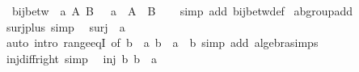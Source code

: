 \begin{isabellebody}
\ \ {\isachardoublequoteopen}bij{\isacharunderscore}{\kern0pt}betw\ {\isacharparenleft}{\kern0pt}{\isacharparenleft}{\kern0pt}{\isacharplus}{\kern0pt}{\isacharparenright}{\kern0pt}\ a{\isacharparenright}{\kern0pt}\ A\ B\ {\isasymlongleftrightarrow}\ {\isacharparenleft}{\kern0pt}{\isacharplus}{\kern0pt}{\isacharparenright}{\kern0pt}\ a\ {\isacharbackquote}{\kern0pt}\ A\ {\isacharequal}{\kern0pt}\ B{\isachardoublequoteclose}\isanewline
%
\isadelimproof
\ \ %
\endisadelimproof
%
\isatagproof
{}\isamarkupfalse%
\ {\isacharparenleft}{\kern0pt}simp\ add{\isacharcolon}{\kern0pt}\ bij{\isacharunderscore}{\kern0pt}betw{\isacharunderscore}{\kern0pt}def{\isacharparenright}{\kern0pt}%
\endisatagproof
{\isafoldproof}%
%
\isadelimproof
\isanewline
%
\endisadelimproof
\isanewline
{}\isamarkupfalse%
\isanewline
\isanewline
{}\isamarkupfalse%
\ ab{\isacharunderscore}{\kern0pt}group{\isacharunderscore}{\kern0pt}add\isanewline
{}\isanewline
\isanewline
{}\isamarkupfalse%
\ surj{\isacharunderscore}{\kern0pt}plus\ {\isacharbrackleft}{\kern0pt}simp{\isacharbrackright}{\kern0pt}{\isacharcolon}{\kern0pt}\isanewline
\ \ {\isachardoublequoteopen}surj\ {\isacharparenleft}{\kern0pt}{\isacharparenleft}{\kern0pt}{\isacharplus}{\kern0pt}{\isacharparenright}{\kern0pt}\ a{\isacharparenright}{\kern0pt}{\isachardoublequoteclose}\isanewline
%
\isadelimproof
\ \ %
\endisadelimproof
%
\isatagproof
{}\isamarkupfalse%
\ {\isacharparenleft}{\kern0pt}auto\ intro{\isacharbang}{\kern0pt}{\isacharcolon}{\kern0pt}\ range{\isacharunderscore}{\kern0pt}eqI\ {\isacharbrackleft}{\kern0pt}of\ b\ {\isachardoublequoteopen}{\isacharparenleft}{\kern0pt}{\isacharplus}{\kern0pt}{\isacharparenright}{\kern0pt}\ a{\isachardoublequoteclose}\ {\isachardoublequoteopen}b\ {\isacharminus}{\kern0pt}\ a{\isachardoublequoteclose}\ \ b{\isacharbrackright}{\kern0pt}{\isacharparenright}{\kern0pt}\ {\isacharparenleft}{\kern0pt}simp\ add{\isacharcolon}{\kern0pt}\ algebra{\isacharunderscore}{\kern0pt}simps{\isacharparenright}{\kern0pt}%
\endisatagproof
{\isafoldproof}%
%
\isadelimproof
\isanewline
%
\endisadelimproof
\isanewline
{}\isamarkupfalse%
\ inj{\isacharunderscore}{\kern0pt}diff{\isacharunderscore}{\kern0pt}right\ {\isacharbrackleft}{\kern0pt}simp{\isacharbrackright}{\kern0pt}{\isacharcolon}{\kern0pt}\isanewline
\ \ {\isacartoucheopen}inj\ {\isacharparenleft}{\kern0pt}{\isasymlambda}b{\isachardot}{\kern0pt}\ b\ {\isacharminus}{\kern0pt}\ a{\isacharparenright}{\kern0pt}{\isacartoucheclose}\isanewline

\end{isabellebody}
